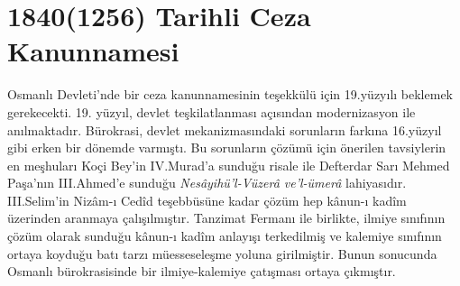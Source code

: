 \section{1840(1256) Tarihli Ceza Kanunnamesi}
\indent\indent Osmanlı Devleti'nde bir ceza kanunnamesinin teşekkülü için 19.yüzyılı beklemek gerekecekti. 19. yüzyıl, devlet teşkilatlanması açısından 
modernizasyon ile anılmaktadır. Bürokrasi, devlet mekanizmasındaki sorunların farkına 16.yüzyıl gibi erken bir dönemde varmıştı. Bu sorunların çözümü için 
önerilen tavsiylerin en meşhuları Koçi Bey'in IV.Murad'a sunduğu risale ile Defterdar Sarı Mehmed Paşa'nın III.Ahmed'e sunduğu \textit{Nesâyihü'l-Vüzerâ ve'l-ümerâ} lahiyasıdır. 
III.Selim'in Nizâm-ı Cedîd teşebbüsüne kadar çözüm hep kânun-ı kadîm üzerinden aranmaya çalışılmıştır. Tanzimat Fermanı ile birlikte, ilmiye sınıfının çözüm olarak 
sunduğu kânun-ı kadîm anlayışı terkedilmiş ve kalemiye sınıfının ortaya koyduğu batı tarzı müesseseleşme yoluna girilmiştir. Bunun sonucunda Osmanlı bürokrasisinde bir ilmiye-kalemiye 
çatışması ortaya çıkmıştır. 

